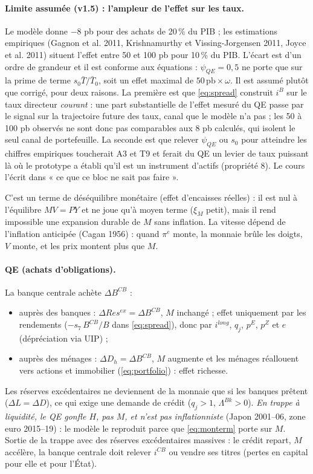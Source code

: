 \documentclass[11pt,a4paper]{article}
\begin{document}
\begin{lecture}
\paragraph{Limite assumée (v1.5) : l'ampleur de l'effet sur les taux.} Le modèle donne $-8$ pb pour des achats de 20\,\% du PIB ; les estimations empiriques (Gagnon et al. 2011, Krishnamurthy et Vissing-Jorgensen 2011, Joyce et al. 2011) situent l'effet entre 50 et 100 pb pour 10\,\% du PIB. L'écart est d'un ordre de grandeur et il est conforme aux équations : $\psi_{QE}=0{,}5$ ne porte que sur la prime de terme $s_0\bar T/\bar T_0$, soit un effet maximal de $50\,\text{pb}\times\omega$. Il est assumé plutôt que corrigé, pour deux raisons. La première est que \eqref{eq:spread} construit $i^B$ sur le taux directeur \emph{courant} : une part substantielle de l'effet mesuré du QE passe par le signal sur la trajectoire future des taux, canal que le modèle n'a pas ; les 50 à 100 pb observés ne sont donc pas comparables aux 8 pb calculés, qui isolent le seul canal de portefeuille. La seconde est que relever $\psi_{QE}$ ou $s_0$ pour atteindre les chiffres empiriques toucherait A3 et T9 et ferait du QE un levier de taux puissant là où le prototype a établi qu'il est un instrument d'actifs (propriété 8). Le cours l'écrit dans « ce que ce bloc ne sait pas faire ».
\end{lecture}
C'est un terme de déséquilibre monétaire (effet d'encaisses réelles) : il est nul à l'équilibre $M V = P Y$ et ne joue qu'à moyen terme ($\xi_M$ petit), mais il rend impossible une expansion durable de $M$ sans inflation. La vitesse dépend de l'inflation anticipée (Cagan 1956) : quand $\pi^e$ monte, la monnaie brûle les doigts, $V$ monte, et les prix montent plus que $M$.

\paragraph{QE (achats d'obligations).} La banque centrale achète $\Delta B^{CB}$ :
\begin{itemize}
\item auprès des banques : $\Delta Res^{ex} = \Delta B^{CB}$, $M$ inchangé ; effet uniquement par les rendements ($-s_7\, B^{CB}/B$ dans \eqref{eq:spread}), donc par $i^{long}$, $q_j$, $p^E$, $p^Z$ et $e$ (dépréciation via UIP) ;
\item auprès des ménages : $\Delta D_h = \Delta B^{CB}$, $M$ augmente et les ménages réallouent vers actions et immobilier (\eqref{eq:portfolio}) : effet richesse.
\end{itemize}
Les réserves excédentaires ne deviennent de la monnaie que si les banques prêtent ($\Delta L = \Delta D$), ce qui exige une demande de crédit ($q_j > 1$, $\Lambda^{Bk} > 0$). \emph{En trappe à liquidité, le QE gonfle $H$, pas $M$, et n'est pas inflationniste} (Japon 2001--06, zone euro 2015--19) : le modèle le reproduit parce que \eqref{eq:monterm} porte sur $M$. Sortie de la trappe avec des réserves excédentaires massives : le crédit repart, $M$ accélère, la banque centrale doit relever $i^{CB}$ ou vendre ses titres (pertes en capital pour elle et pour l'État).
\end{document}
